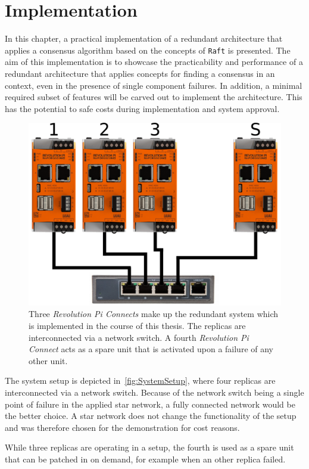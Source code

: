 \chapter{Implementation}
\label{cpt:Implementation}

In this chapter, a practical implementation of a redundant architecture that applies a consensus algorithm based on the concepts of \texttt{Raft} is presented.
The aim of this implementation is to showcase the practicability and performance of a redundant architecture that applies  concepts for finding a consensus in an  context, even in the presence of single component failures.
In addition, a minimal required subset of  features will be carved out to implement the architecture.
This has the potential to safe costs during implementation and system approval.
\\

\begin{figure}[!hb]
	\centering
	\includegraphics[width=0.7\linewidth]{images/setup}
	\caption{Three \textit{Revolution Pi Connects} make up the redundant system which is implemented in the course of this thesis. The replicas are interconnected via a network switch. A fourth \textit{Revolution Pi Connect} acts as a spare unit that is activated upon a failure of any other unit.}
	\label{fig:SystemSetup}
\end{figure}

The system setup is depicted in~\autoref{fig:SystemSetup}, where four replicas are interconnected via a network switch.
Because of the network switch being a single point of failure in the applied star network, a fully connected network would be the better choice.
A star network does not change the functionality of the setup and was therefore chosen for the demonstration for cost reasons.

While three replicas are operating in a  setup, the fourth is used as a spare unit that can be patched in on demand, for example when an other replica failed.

